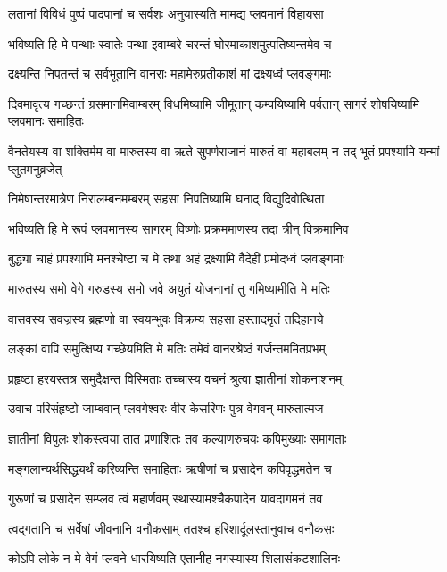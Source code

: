 \twolineshloka
{लतानां विविधं पुष्पं पादपानां च सर्वशः}
{अनुयास्यति मामद्य प्लवमानं विहायसा} %

\twolineshloka
{भविष्यति हि मे पन्थाः स्वातेः पन्था इवाम्बरे}
{चरन्तं घोरमाकाशमुत्पतिष्यन्तमेव च} %

\twolineshloka
{द्रक्ष्यन्ति निपतन्तं च सर्वभूतानि वानराः}
{महामेरुप्रतीकाशं मां द्रक्ष्यध्वं प्लवङ्गमाः} %

\threelineshloka
{दिवमावृत्य गच्छन्तं ग्रसमानमिवाम्बरम्}
{विधमिष्यामि जीमूतान् कम्पयिष्यामि पर्वतान्}
{सागरं शोषयिष्यामि प्लवमानः समाहितः} %

\threelineshloka
{वैनतेयस्य वा शक्तिर्मम वा मारुतस्य वा}
{ऋते सुपर्णराजानं मारुतं वा महाबलम्}
{न तद् भूतं प्रपश्यामि यन्मां प्लुतमनुव्रजेत्} %

\twolineshloka
{निमेषान्तरमात्रेण निरालम्बनमम्बरम्}
{सहसा निपतिष्यामि घनाद् विद्युदिवोत्थिता} %

\twolineshloka
{भविष्यति हि मे रूपं प्लवमानस्य सागरम्}
{विष्णोः प्रक्रममाणस्य तदा त्रीन् विक्रमानिव} %

\twolineshloka
{बुद्ध्या चाहं प्रपश्यामि मनश्चेष्टा च मे तथा}
{अहं द्रक्ष्यामि वैदेहीं प्रमोदध्वं प्लवङ्गमाः} %

\twolineshloka
{मारुतस्य समो वेगे गरुडस्य समो जवे}
{अयुतं योजनानां तु गमिष्यामीति मे मतिः} %

\twolineshloka
{वासवस्य सवज्रस्य ब्रह्मणो वा स्वयम्भुवः}
{विक्रम्य सहसा हस्तादमृतं तदिहानये} %

\twolineshloka
{लङ्कां वापि समुत्क्षिप्य गच्छेयमिति मे मतिः}
{तमेवं वानरश्रेष्ठं गर्जन्तममितप्रभम्} %

\twolineshloka
{प्रहृष्टा हरयस्तत्र समुदैक्षन्त विस्मिताः}
{तच्चास्य वचनं श्रुत्वा ज्ञातीनां शोकनाशनम्} %

\twolineshloka
{उवाच परिसंहृष्टो जाम्बवान् प्लवगेश्वरः}
{वीर केसरिणः पुत्र वेगवन् मारुतात्मज} %

\twolineshloka
{ज्ञातीनां विपुलः शोकस्त्वया तात प्रणाशितः}
{तव कल्याणरुचयः कपिमुख्याः समागताः} %

\twolineshloka
{मङ्गलान्यर्थसिद्ध्यर्थं करिष्यन्ति समाहिताः}
{ऋषीणां च प्रसादेन कपिवृद्धमतेन च} %

\twolineshloka
{गुरूणां च प्रसादेन सम्प्लव त्वं महार्णवम्}
{स्थास्यामश्चैकपादेन यावदागमनं तव} %

\twolineshloka
{त्वद्गतानि च सर्वेषां जीवनानि वनौकसाम्}
{ततश्च हरिशार्दूलस्तानुवाच वनौकसः} %

\twolineshloka
{कोऽपि लोके न मे वेगं प्लवने धारयिष्यति}
{एतानीह नगस्यास्य शिलासंकटशालिनः} %

